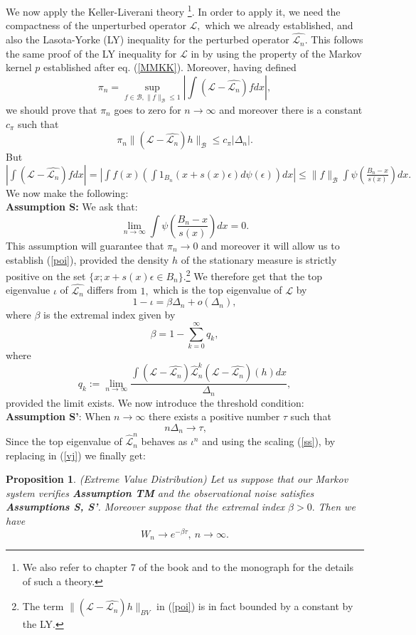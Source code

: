 \documentclass{article}
\newcommand{\1}{\mathbbm{1}}
\newtheorem{proposition}[theorem]{Proposition}
\begin{document}
We now apply the Keller-Liverani theory \cite{KL1,KL2}\footnote{We also refer to chapter 7 of the book \cite{book} and to the monograph \cite{last} for the details of such a theory.}. In order to apply it, we need the compactness of the unperturbed operator $\mathcal{L},$ which we already established, and also the Lasota-Yorke (LY) inequality for the perturbed operator $\hat{\mathcal{L}_n}$. This follows the same proof of the LY inequality for $\mathcal{L}$ in \cite{lillo21} by using the property of the Markov kernel $p$  established after eq. (\ref{MMKK}).   Moreover, having defined
$$
\pi_n=\sup_{f\in \mathcal{B}, \|f\|_{\mathcal{B}}\le1}\left|\int (\mathcal{L}-\hat{\mathcal{L}_n})fdx\right|,
$$
we should prove that $\pi_n$ goes to zero for $n\rightarrow \infty$ and moreover there is a constant $c_{\pi}$ such that
\begin{equation}\label{poi}
\pi_n \|(\mathcal{L}-\hat{\mathcal{L}_n})h\|_{\mathcal{B}}\le c_{\pi}|\Delta_n|.
\end{equation}
But $\left|\int (\mathcal{L}-\hat{\mathcal{L}_n})fdx\right|=\left|\int f(x)\left( \int 1_{B_n}(x+s(x)\epsilon)d\psi (\epsilon)\right)dx\right|\le \|f\|_{\mathcal{B}} \int \psi\left(\frac{B_n-x}{s(x)}\right)dx.$ We now make the following:\\
{\bf Assumption S:} We ask that:
$$
\lim_{n\rightarrow \infty}    \int \psi\left(\frac{B_n-x}{s(x)}\right)dx=0. 
$$
This assumption will guarantee that $\pi_n\rightarrow 0$ and moreover it will allow us to establish (\ref{poi}), provided the density $h$ of the stationary measure is strictly positive on the set $\{x; x+s(x)\epsilon \in B_n\}.$\footnote{The term $\|(\mathcal{L}-\hat{\mathcal{L}_n})h\|_{BV}$ in (\ref{poi}) is in fact bounded by a constant by the LY.}
We therefore get that the top eigenvalue $\iota$ of $\hat{\mathcal{L}_n}$ differs from $1,$ which is the top eigenvalue of $\mathcal{L}$ by
$$
1-\iota= \beta\Delta_n+o(\Delta_n), 
$$
where   $\beta$ is the extremal index
given by 
$$
\beta=1-\sum_{k=0}^{\infty}q_k,
$$
where
$$
q_k:=\lim_{n\rightarrow \infty}\frac{\int(\mathcal{L}-\hat{\mathcal{L}_n}) \hat{\mathcal{L}}_n^k(\mathcal{L}-\hat{\mathcal{L}_n})(h)dx}{\Delta_n},
$$
provided the limit exists.
We now introduce the threshold condition:\\

{\bf Assumption S'}: When $n\rightarrow \infty$ there exists a positive number $\tau$ such that 
\begin{equation}\label{ss}
 \ n \Delta_n\rightarrow \tau,
\end{equation}Since the top eigenvalue of $\hat{\mathcal{L}}_n^n$ behaves as $\iota^n$ and using the scaling (\ref{ss}), by replacing in (\ref{vj}) we finally   get:
\begin{proposition}(Extreme Value Distribution)
Let us suppose that our Markov system verifies {\bf Assumption TM} and the observational noise satisfies {\bf Assumptions S, S'}. Moreover suppose that the extremal index $\beta>0.$ Then we have
$$
W_n\rightarrow e^{-\beta \tau}, \ n\rightarrow \infty.
$$
\end{proposition}
\end{document}
